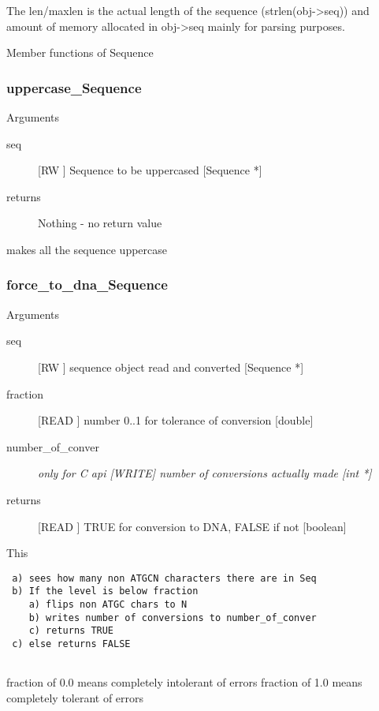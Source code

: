 The len/maxlen is the actual length
of the sequence (strlen(obj->seq)) and
amount of memory allocated in obj->seq 
mainly for parsing purposes.






Member functions of Sequence

\subsubsection{uppercase_Sequence}

Arguments
\begin{description}
\item[seq] [RW   ] Sequence to be uppercased [Sequence *]
\item[returns] Nothing - no return value
\end{description}
makes all the sequence uppercase


\subsubsection{force_to_dna_Sequence}

Arguments
\begin{description}
\item[seq] [RW   ] sequence object read and converted  [Sequence *]
\item[fraction] [READ ] number 0..1 for tolerance of conversion [double]
\item[number_of_conver] \em{only for C api} [WRITE] number of conversions actually made [int *]
\item[returns] [READ ] TRUE for conversion to DNA, FALSE if not [boolean]
\end{description}
This 
\begin{verbatim}
 a) sees how many non ATGCN characters there are in Seq
 b) If the level is below fraction
    a) flips non ATGC chars to N
    b) writes number of conversions to number_of_conver
    c) returns TRUE
 c) else returns FALSE


\end{verbatim}
fraction of 0.0 means completely intolerant of errors
fraction of 1.0 means completely tolerant of errors




